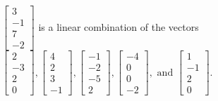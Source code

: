 \begin{exercise}
\begin{exerciseStatement}
  \end{exerciseStatement}
  \begin{exerciseAnswer}
   \(\left[\begin{array}{c}
3 \\
-1 \\
7 \\
-2
\end{array}\right]\) 
  	 is  
	a linear combination of the vectors \(\left[\begin{array}{c}
2 \\
-3 \\
2 \\
0
\end{array}\right] , \left[\begin{array}{c}
4 \\
2 \\
3 \\
-1
\end{array}\right] , \left[\begin{array}{c}
-1 \\
-2 \\
-5 \\
2
\end{array}\right] , \left[\begin{array}{c}
-4 \\
0 \\
0 \\
-2
\end{array}\right] , \text{ and } \left[\begin{array}{c}
1 \\
-1 \\
2 \\
0
\end{array}\right]\).

	
  


  \end{exerciseAnswer}
\end{exercise}
